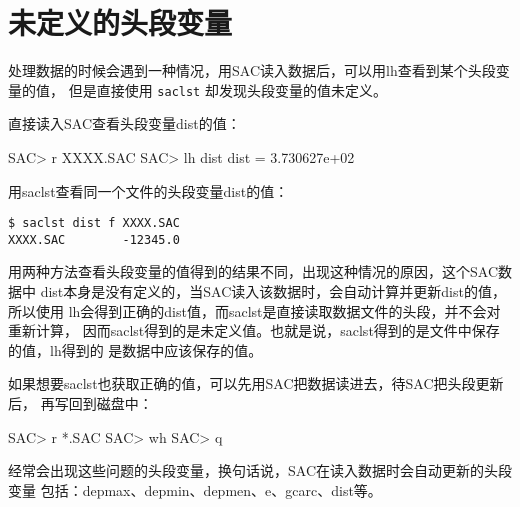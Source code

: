 \section{未定义的头段变量}
处理数据的时候会遇到一种情况，用SAC读入数据后，可以用lh查看到某个头段变量的值，
但是直接使用 \texttt{saclst} 却发现头段变量的值未定义。

直接读入SAC查看头段变量dist的值：
\begin{SACCode}
SAC> r XXXX.SAC
SAC> lh dist
     dist = 3.730627e+02
\end{SACCode}

用saclst查看同一个文件的头段变量dist的值：
\begin{verbatim}
$ saclst dist f XXXX.SAC
XXXX.SAC        -12345.0
\end{verbatim}

用两种方法查看头段变量的值得到的结果不同，出现这种情况的原因，这个SAC数据中
dist本身是没有定义的，当SAC读入该数据时，会自动计算并更新dist的值，所以使用
lh会得到正确的dist值，而saclst是直接读取数据文件的头段，并不会对重新计算，
因而saclst得到的是未定义值。也就是说，saclst得到的是文件中保存的值，lh得到的
是数据中应该保存的值。

如果想要saclst也获取正确的值，可以先用SAC把数据读进去，待SAC把头段更新后，
再写回到磁盘中：
\begin{SACCode}
SAC> r *.SAC
SAC> wh
SAC> q
\end{SACCode}

经常会出现这些问题的头段变量，换句话说，SAC在读入数据时会自动更新的头段变量
包括：depmax、depmin、depmen、e、gcarc、dist等。
